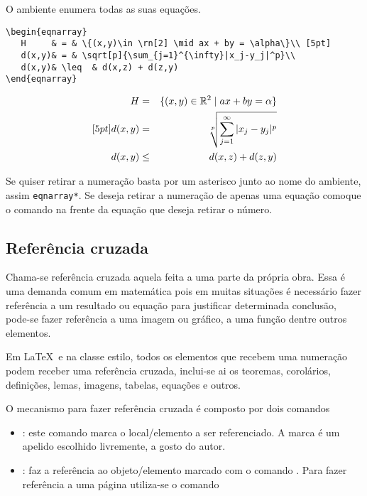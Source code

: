 O ambiente  enumera todas as suas equações.

\begin{tcolorbox}[title={Ambiente eqnarray}]
\begin{lstlisting}
\begin{eqnarray}
   H     & = & \{(x,y)\in \rn[2] \mid ax + by = \alpha\}\\ [5pt]
   d(x,y)& = & \sqrt[p]{\sum_{j=1}^{\infty}|x_j-y_j|^p}\\
   d(x,y)& \leq  & d(x,z) + d(z,y)
\end{eqnarray}
\end{lstlisting}

\tcblower
\begin{eqnarray}
   H     & = & \{(x,y)\in \rn[2] \mid ax + by = \alpha\}\\ [5pt]
   d(x,y)& = & \sqrt[p]{\sum_{j=1}^{\infty}|x_j-y_j|^p}\\ 
   d(x,y)& \leq  & d(x,z) + d(z,y)
\end{eqnarray}
\end{tcolorbox}

Se quiser retirar a numeração basta por um asterisco junto ao nome do ambiente, assim 
\verb|eqnarray*|. Se deseja retirar a numeração de apenas uma equação comoque o comando
 na frente da equação que deseja retirar o número.

\subsection{Referência cruzada}\label{cruzada}

Chama-se referência cruzada aquela feita a uma parte da própria obra. Essa é uma 
demanda comum em matemática pois em muitas situações é necessário fazer referência 
a um resultado ou equação para justificar determinada conclusão, pode-se fazer 
referência a uma imagem ou gráfico, a uma função dentre outros elementos.

Em \LaTeX\ e na classe estilo,  todos os elementos que recebem uma numeração podem 
receber uma referência cruzada, inclui-se ai os teoremas, corolários, definições, 
lemas, imagens, tabelas, equações e  outros.


O mecanismo para fazer referência cruzada é composto por dois comandos
\begin{itemize}
 \item {}: este comando marca o local/elemento a ser referenciado.
     A marca é um apelido escolhido livremente, a gosto do autor.
 \item {}: faz a referência ao objeto/elemento marcado com o comando 
     . Para fazer referência a uma página utiliza-se o comando
\end{itemize}

